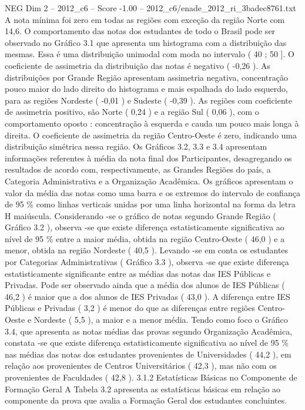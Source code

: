 \begin{textsample}{NEG Dim 2 – 2012\_c6 – Score -1.00 – 2012\_c6/enade\_2012\_ri\_3badec8761.txt}
A nota mínima foi zero em todas as regiões com exceção da região Norte com 14,6.
O comportamento das notas dos estudantes de todo o Brasil pode ser observado no Gráfico 3.1 que apresenta um histograma com a distribuição das mesmas.
Essa é uma distribuição unimodal com moda no intervalo ( 40 ; 50 ].
O coeficiente de assimetria da distribuição das notas é negativo ( -0,26 ).
As distribuições por Grande Região apresentam assimetria negativa, concentração pouco maior do lado direito do histograma e mais espalhada do lado esquerdo, para as regiões Nordeste ( -0,01 ) e Sudeste ( -0,39 ).
As regiões com coeficiente de assimetria positivo, são Norte ( 0,24 ) e a região Sul ( 0,06 ), com o comportamento oposto : concentração à esquerda e cauda um pouco mais longa à direita.
O coeficiente de assimetria da região Centro-Oeste é zero, indicando uma distribuição simétrica nessa região.
Os Gráficos 3.2, 3.3 e 3.4 apresentam informações referentes à média da nota final dos Participantes, desagregando os resultados de acordo com, respectivamente, as Grandes Regiões do país, a Categoria Administrativa e a Organização Acadêmica.
Os gráficos apresentam o valor da média das notas como uma barra e os extremos do intervalo de confiança de 95 \% como linhas verticais unidas por uma linha horizontal na forma da letra H maiúscula.
Considerando -se o gráfico de notas segundo Grande Região ( Gráfico 3.2 ), observa -se que existe diferença estatisticamente significativa ao nível de 95 \% entre a maior média, obtida na região Centro-Oeste ( 46,0 ) e a menor, obtida na região Nordeste ( 40,5 ).
Levando -se em conta os estudantes por Categorias Administrativas ( Gráfico 3.3 ), observa -se que existe diferença estatisticamente significante entre as médias das notas das IES Públicas e Privadas.
Pode ser observado ainda que a média dos alunos de IES Públicas ( 46,2 ) é maior que a dos alunos de IES Privadas ( 43,0 ).
A diferença entre IES Públicas e Privadas ( 3,2 ) é menor do que as diferenças entre regiões Centro-Oeste e Nordeste ( 5,5 ), a maior e a menor média.
Tendo como foco o Gráfico 3.4, que apresenta as notas médias das provas segundo Organização Acadêmica, constata -se que existe diferença estatisticamente significativa ao nível de 95 \% nas médias das notas dos estudantes provenientes de Universidades ( 44,2 ), em relação aos provenientes de Centros Universitários ( 42,3 ), mas não com os provenientes de Faculdades ( 42,8 ). 3.1.2 Estatísticas Básicas no Componente de Formação Geral A Tabela 3.2 apresenta as estatísticas básicas em relação ao componente da prova que avalia a Formação Geral dos estudantes concluintes.

\end{textsample}
